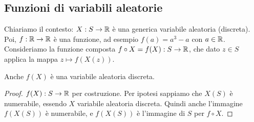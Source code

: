 \subsection{Funzioni di variabili aleatorie}

Chiariamo il contesto: $X : S \to \mathbb{R}$ \`e una generica variabile aleatoria (discreta). Poi, $f : \mathbb{R} \to \mathbb{R}$ \`e una funzione, ad esempio $f(a) = a^3 - a$ con $a \in \mathbb{R}$. Consideriamo la funzione composta $f \circ X = f(X) : S \to \mathbb{R}$, che dato $z \in S$ applica la mappa $z \mapsto f(X(z))$.

\begin{fact}
Anche $f(X)$ \`e una variabile aleatoria discreta.
\end{fact}
\begin{proof}
$f(X) : S \to \mathbb{R}$ per costruzione. Per ipotesi sappiamo che $X(S)$ \`e numerabile, essendo $X$ variabile aleatoria discreta. Quindi anche l'immagine $f(X(S))$ \`e numerabile, e $f(X(S))$ \`e l'immagine di $S$ per $f \circ X$.
\end{proof}

